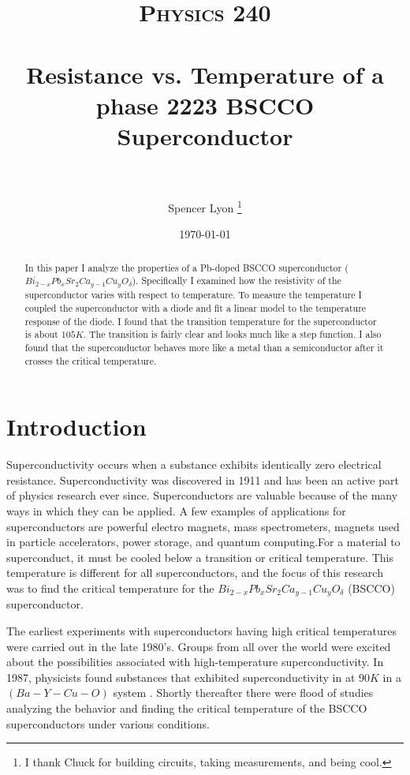 \documentclass[paper=a4, fontsize=11pt]{scrartcl}
\title{
    \vspace{-.3in}
    \usefont{OT1}{bch}{b}{n}
    \normalfont \normalsize \textsc{Physics 240} \\ [25pt]
    \horrule{0.5pt} \\[0.4cm]
    \huge Resistance vs. Temperature of a phase 2223 BSCCO Superconductor \\
    \horrule{2pt} \\[0.5cm]
  }
\author{
    Spencer Lyon
    \thanks{I thank Chuck for building circuits, taking measurements, and being cool.}
  }
\date{
  \normalfont \normalsize
  \today \\[-4pt] \normalsize
  }
\numberwithin{equation}{section}
\numberwithin{figure}{section}
\numberwithin{table}{section}
\begin{document}
  \begin{titlepage}
      \pagestyle{empty}
      \maketitle

      \begin{abstract}
            \begin{center}
            \small{
                  In this paper I analyze the properties of a Pb-doped BSCCO superconductor ($Bi_{2-x}Pb_xSr_2Ca_{y-1}Cu_yO_{\delta}$). Specifically I examined how the resistivity of the superconductor varies with respect to temperature. To measure the temperature I coupled the superconductor with a diode and fit a linear model to the temperature response of the diode. I found that the transition temperature for the superconductor is about $105K$. The transition is fairly clear and looks much like a step function. I also found that the superconductor behaves more like a metal than a semiconductor after it crosses the critical temperature.
            }
            \end{center}
      \end{abstract}
  \end{titlepage}

  \pagestyle{fancyplain}
  \setcounter{page}{1}

  \section{Introduction}

      Superconductivity occurs when a substance exhibits identically zero electrical resistance. Superconductivity was discovered in 1911 and has been an active part of physics research ever since. Superconductors are valuable because of the many ways in which they can be applied. A few examples of applications for superconductors are powerful electro magnets, mass spectrometers, magnets used in particle accelerators, power storage, and quantum computing.For a material to superconduct, it must be cooled below a transition or critical temperature. This temperature is different for all superconductors, and the focus of this research was to find the critical temperature for the $Bi_{2-x}Pb_xSr_2Ca_{y-1}Cu_yO_{\delta}$ (BSCCO) superconductor.

      The earliest experiments with superconductors having high critical temperatures were carried out in the late 1980's. Groups from all over the world were excited about the possibilities associated with high-temperature superconductivity. In 1987, physicists found substances that exhibited superconductivity in at $90K$ in a $(Ba-Y-Cu-O)$ system \citep{Ashburn:1987}. Shortly thereafter there were flood of studies analyzing the behavior and finding the critical temperature of the BSCCO superconductors under various conditions.
\end{document}
